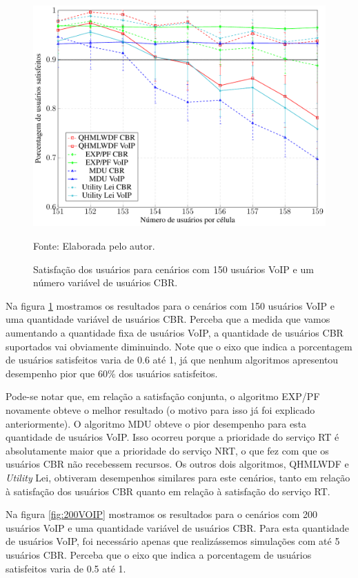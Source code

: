 \begin{figure}[b]
	\centering
	
	\caption[Satisfação dos usuários para cenários com 150 usuários VoIP e um número variável de usuários CBR]{Satisfação dos usuários para cenários com 150 usuários VoIP e um número variável de usuários CBR.}
	\includegraphics[width=.8\linewidth]{figs/150VOIP.pdf}
	
	{Fonte: Elaborada pelo autor.}	
	\label{fig:150VOIP}
\end{figure}

Na figura \ref{fig:150VOIP} mostramos os resultados para o cenários com 150 usuários VoIP e uma quantidade variável de usuários CBR. Perceba que a medida que vamos aumentando a quantidade fixa de usuários VoIP, a quantidade de usuários CBR suportados vai obviamente diminuindo. Note que o eixo que indica a porcentagem de usuários satisfeitos varia de 0.6 até 1, já que nenhum algoritmos apresentou desempenho pior que 60\% dos usuários satisfeitos. 

Pode-se notar que, em relação a satisfação conjunta, o algoritmo EXP/PF novamente obteve o melhor resultado (o motivo para isso já foi explicado anteriormente). O algoritmo MDU  obteve o pior desempenho para esta quantidade de usuários VoIP. Isso ocorreu porque a prioridade do serviço RT é absolutamente maior que a prioridade do serviço NRT, o que fez com que os usuários CBR não recebessem recursos. Os outros dois algoritmos, QHMLWDF e \textit{Utility} Lei, obtiveram desempenhos similares para este cenários, tanto em relação à satisfação dos usuários CBR quanto em relação à satisfação do serviço RT.

Na figura \ref{fig:200VOIP} mostramos os resultados para o cenários com 200 usuários VoIP e uma quantidade variável de usuários CBR. Para esta quantidade de usuários VoIP, foi necessário apenas que realizássemos simulações com até 5 usuários CBR. Perceba que o eixo que indica a porcentagem de usuários satisfeitos varia de 0.5 até 1.

